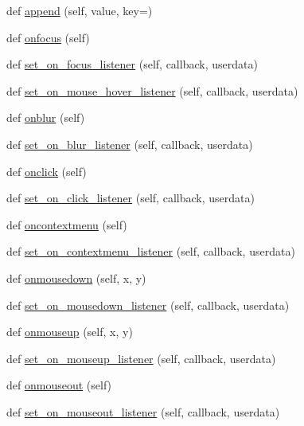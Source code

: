 \begin{DoxyCompactItemize}
\item 
def \hyperlink{classremi_1_1gui_1_1Widget_a131564831f6fd2b468be84c47e0b2115}{append} (self, value, key=\textquotesingle{}\textquotesingle{})
\item 
def \hyperlink{classremi_1_1gui_1_1Widget_ac6d1b9a2fae13a9f915a7cf24a70962a}{onfocus} (self)
\item 
def \hyperlink{classremi_1_1gui_1_1Widget_ab524f235c7dd5d60d5cb2fa5821ad448}{set\+\_\+on\+\_\+focus\+\_\+listener} (self, callback, userdata)
\item 
def \hyperlink{classremi_1_1gui_1_1Widget_a1725d293967b2238034de4882b40ff7e}{set\+\_\+on\+\_\+mouse\+\_\+hover\+\_\+listener} (self, callback, userdata)
\item 
def \hyperlink{classremi_1_1gui_1_1Widget_ae0882945f8fb3fc4ce42203fe2e9a6c4}{onblur} (self)
\item 
def \hyperlink{classremi_1_1gui_1_1Widget_ad112638ff1e83425a7796ee95bb99d3f}{set\+\_\+on\+\_\+blur\+\_\+listener} (self, callback, userdata)
\item 
def \hyperlink{classremi_1_1gui_1_1Widget_ad036cd96fa5abd6055fa875fa150f08c}{onclick} (self)
\item 
def \hyperlink{classremi_1_1gui_1_1Widget_a960d4c24b9ca170541cd19203529c93b}{set\+\_\+on\+\_\+click\+\_\+listener} (self, callback, userdata)
\item 
def \hyperlink{classremi_1_1gui_1_1Widget_a9c709e4c55e735f56725657d34c411ce}{oncontextmenu} (self)
\item 
def \hyperlink{classremi_1_1gui_1_1Widget_a5cfa1789ddf5236fdd2c7e647da4ba2c}{set\+\_\+on\+\_\+contextmenu\+\_\+listener} (self, callback, userdata)
\item 
def \hyperlink{classremi_1_1gui_1_1Widget_a6fb4528091d3ecc9c92afe12aabd3735}{onmousedown} (self, x, y)
\item 
def \hyperlink{classremi_1_1gui_1_1Widget_a7e570c33dfb5cd49ec50bcbe5831ecb4}{set\+\_\+on\+\_\+mousedown\+\_\+listener} (self, callback, userdata)
\item 
def \hyperlink{classremi_1_1gui_1_1Widget_ad8bff8cf2b3e2cea4682f7879b3b6e99}{onmouseup} (self, x, y)
\item 
def \hyperlink{classremi_1_1gui_1_1Widget_a8b4dafe3427623f86c5daf620c4ceeb1}{set\+\_\+on\+\_\+mouseup\+\_\+listener} (self, callback, userdata)
\item 
def \hyperlink{classremi_1_1gui_1_1Widget_a1462eb1d4a9d2abd8300c3088b56b960}{onmouseout} (self)
\item 
def \hyperlink{classremi_1_1gui_1_1Widget_a661ee40bdce000e3b3c10e0ff053e9f9}{set\+\_\+on\+\_\+mouseout\+\_\+listener} (self, callback, userdata)

\end{DoxyCompactItemize}
